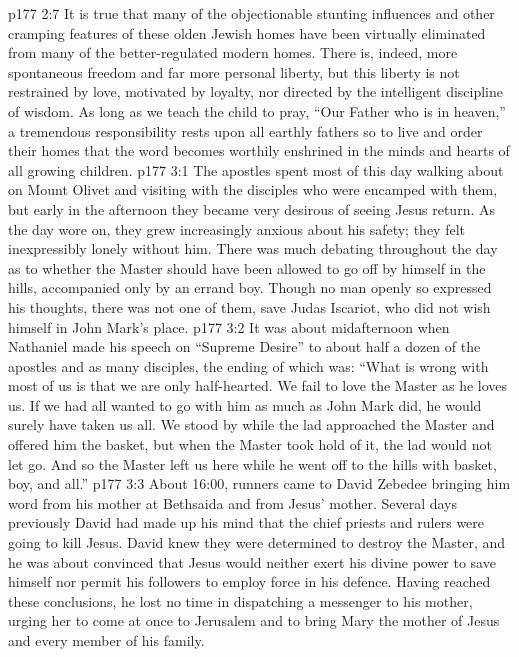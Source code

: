 \vs p177 2:7 It is true that many of the objectionable stunting influences and other cramping features of these olden Jewish homes have been virtually eliminated from many of the better\hyp{}regulated modern homes. There is, indeed, more spontaneous freedom and far more personal liberty, but this liberty is not restrained by love, motivated by loyalty, nor directed by the intelligent discipline of wisdom. As long as we teach the child to pray, “Our Father who is in heaven,” a tremendous responsibility rests upon all earthly fathers so to live and order their homes that the word  becomes worthily enshrined in the minds and hearts of all growing children.
\vs p177 3:1 The apostles spent most of this day walking about on Mount Olivet and visiting with the disciples who were encamped with them, but early in the afternoon they became very desirous of seeing Jesus return. As the day wore on, they grew increasingly anxious about his safety; they felt inexpressibly lonely without him. There was much debating throughout the day as to whether the Master should have been allowed to go off by himself in the hills, accompanied only by an errand boy. Though no man openly so expressed his thoughts, there was not one of them, save Judas Iscariot, who did not wish himself in John Mark’s place.
\vs p177 3:2 \pc It was about midafternoon when Nathaniel made his speech on “Supreme Desire” to about half a dozen of the apostles and as many disciples, the ending of which was: “What is wrong with most of us is that we are only half\hyp{}hearted. We fail to love the Master as he loves us. If we had all wanted to go with him as much as John Mark did, he would surely have taken us all. We stood by while the lad approached the Master and offered him the basket, but when the Master took hold of it, the lad would not let go. And so the Master left us here while he went off to the hills with basket, boy, and all.”
\vs p177 3:3 \pc About 16:00, runners came to David Zebedee bringing him word from his mother at Bethsaida and from Jesus’ mother. Several days previously David had made up his mind that the chief priests and rulers were going to kill Jesus. David knew they were determined to destroy the Master, and he was about convinced that Jesus would neither exert his divine power to save himself nor permit his followers to employ force in his defence. Having reached these conclusions, he lost no time in dispatching a messenger to his mother, urging her to come at once to Jerusalem and to bring Mary the mother of Jesus and every member of his family.
